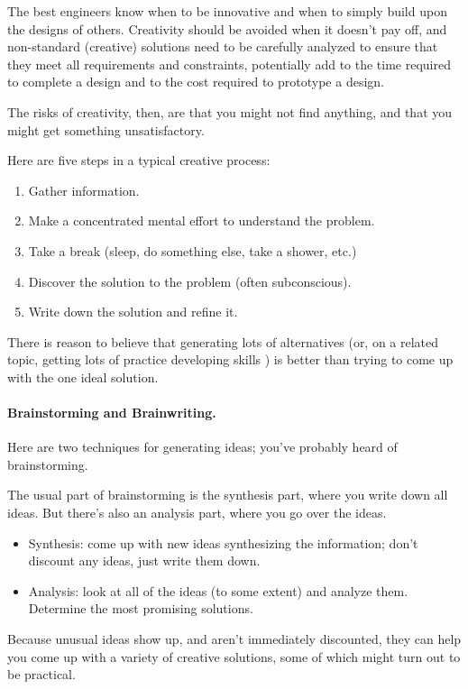 The best engineers know when to be innovative and when to simply build 
upon the designs of others. Creativity should be avoided when it doesn't
pay off, and non-standard (creative) solutions need to be carefully
analyzed to ensure that they meet all requirements and constraints,
potentially add to the time required to complete a design and to the cost
required to prototype a design.

The risks of creativity, then, are that you might not find anything,
and that you might get something unsatisfactory.

Here are five steps in a typical creative process:
\begin{enumerate}
\item Gather information.
\item Make a concentrated mental effort to understand the problem.
\item Take a break (sleep, do something else, take a shower, etc.)
\item Discover the solution to the problem (often subconscious).
\item Write down the solution and refine it.
\end{enumerate}

There is reason to believe that generating lots of alternatives (or,
on a related topic, getting lots of practice developing 
skills \cite{lifeClever, lifeclever2}) is
better than trying to come up with the one ideal solution.

\paragraph{Brainstorming and Brainwriting.} Here are two techniques for
generating ideas; you've probably heard of brainstorming.

The usual part of brainstorming is the synthesis part, where you write
down all ideas. But there's also an analysis part, where you go over the 
ideas.

\begin{itemize}
\item Synthesis: come up with new ideas synthesizing the information;
don't discount any ideas, just write them down.
\item Analysis: look at all of the ideas (to some extent) and analyze them. Determine the most promising solutions.
\end{itemize}
Because unusual ideas show up, and aren't immediately discounted, 
they can help you come up with a variety of creative solutions, some of 
which might turn out to be practical.

